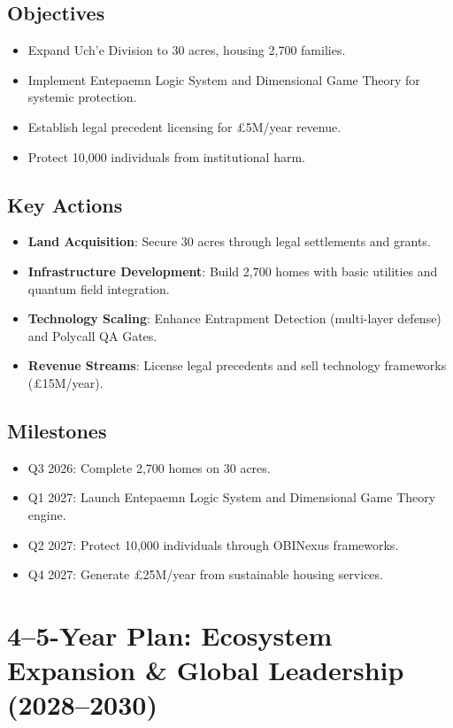 \documentclass[12pt]{article}\usepackage[a4paper,margin=1in]{geometry}
\begin{document}
\subsection*{Objectives}
\begin{itemize}
    \item Expand Uch'e Division to 30 acres, housing 2,700 families.
    \item Implement Entepaemn Logic System and Dimensional Game Theory for systemic protection.
    \item Establish legal precedent licensing for £5M/year revenue.
    \item Protect 10,000 individuals from institutional harm.
\end{itemize}\subsection*{Key Actions}
\begin{itemize}
    \item \textbf{Land Acquisition}: Secure 30 acres through legal settlements and grants.
    \item \textbf{Infrastructure Development}: Build 2,700 homes with basic utilities and quantum field integration.
    \item \textbf{Technology Scaling}: Enhance Entrapment Detection (multi-layer defense) and Polycall QA Gates.
    \item \textbf{Revenue Streams}: License legal precedents and sell technology frameworks (£15M/year).
\end{itemize}\subsection*{Milestones}
\begin{itemize}
    \item Q3 2026: Complete 2,700 homes on 30 acres.
    \item Q1 2027: Launch Entepaemn Logic System and Dimensional Game Theory engine.
    \item Q2 2027: Protect 10,000 individuals through OBINexus frameworks.
    \item Q4 2027: Generate £25M/year from sustainable housing services.
\end{itemize}\section*{4--5-Year Plan: Ecosystem Expansion & Global Leadership (2028--2030)}
\end{document}
